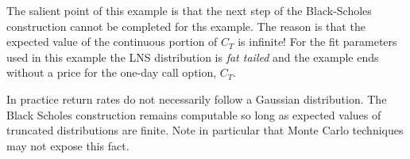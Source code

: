 The salient point of this example is that the next step of the Black-Scholes construction cannot be completed for ths example. The reason is that the expected value of the continuous portion of $C_T$ is infinite! For the fit parameters used in this example the LNS distribution is \emph{fat tailed} and the example ends without a price for the one-day call option, $C_T$.

In practice return rates do not necessarily follow a Gaussian distribution. The Black Scholes construction remains computable so long as expected values of truncated distributions are finite. Note in particular that Monte Carlo techniques may not expose this fact.
